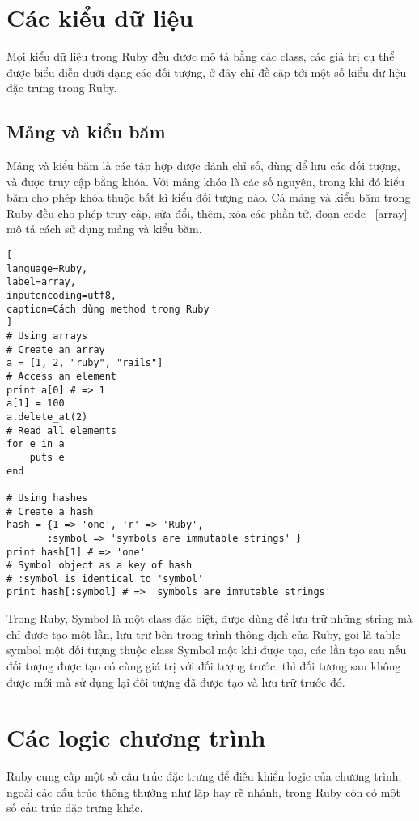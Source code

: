 \section{Các kiểu dữ liệu}
Mọi kiểu dữ liệu trong Ruby đều được mô tả bằng các class, các giá trị cụ thể được biểu diễn dưới dạng các đối tượng, ở đây chỉ đề cập tới một số kiểu dữ liệu đặc trưng trong Ruby.  
\subsection{Mảng và kiểu băm}
Mảng và kiểu băm là các tập hợp được đánh chỉ số, dùng để lưu các đối tượng, và được truy cập bằng khóa. Với mảng khóa là các số nguyên, trong khi đó kiểu băm cho phép khóa thuộc bất kì kiểu đối tượng nào. Cả mảng và kiểu băm trong Ruby đều cho phép truy cập, sửa đổi, thêm, xóa các phần tử, đoạn code ~\ref{array} mô tả cách sử dụng mảng và kiểu băm.
\begin{lstlisting}[
language=Ruby,
label=array,
inputencoding=utf8,
caption=Cách dùng method trong Ruby
]
# Using arrays
# Create an array
a = [1, 2, "ruby", "rails"]
# Access an element
print a[0] # => 1
a[1] = 100
a.delete_at(2)
# Read all elements
for e in a
    puts e
end

# Using hashes
# Create a hash
hash = {1 => 'one', 'r' => 'Ruby', 
       :symbol => 'symbols are immutable strings' }
print hash[1] # => 'one'
# Symbol object as a key of hash
# :symbol is identical to 'symbol'
print hash[:symbol] # => 'symbols are immutable strings'
\end{lstlisting}

Trong Ruby, Symbol là một class đặc biệt, được dùng để lưu trữ những string mà chỉ được tạo một lần, lưu trữ bên trong trình thông dịch của Ruby, gọi là table symbol một đối tượng thuộc class Symbol một khi được tạo, các lần tạo sau nếu đối tượng được tạo có cùng giá trị với đối tượng trước, thì đối tượng sau không được mới mà sử dụng lại đối tượng đã được tạo và lưu trữ trước đó.

\section{Các logic chương trình}
Ruby cung cấp một số cấu trúc đặc trưng để điều khiển logic của chương trình, ngoài các cấu trúc thông thường như lặp hay rẽ nhánh, trong Ruby còn có một số cấu trúc đặc trưng khác. 
